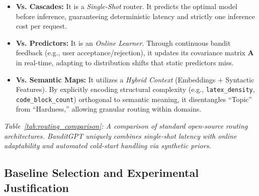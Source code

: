 \begin{itemize}
    \item \textbf{Vs. Cascades:} It is a \textit{Single-Shot} router. It predicts the optimal model before inference, guaranteeing deterministic latency and strictly one inference cost per request.
    \item \textbf{Vs. Predictors:} It is an \textit{Online Learner}. Through continuous bandit feedback (e.g., user acceptance/rejection), it updates its covariance matrix $\mathbf{A}$ in real-time, adapting to distribution shifts that static predictors miss.
    \item \textbf{Vs. Semantic Maps:} It utilizes a \textit{Hybrid Context} (Embeddings + Syntactic Features). By explicitly encoding structural complexity (e.g., \texttt{latex\_density}, \texttt{code\_block\_count}) orthogonal to semantic meaning, it disentangles ``Topic'' from ``Hardness,'' allowing granular routing within domains.
\end{itemize}

\begin{table}[h]
\centering
\caption{Feature Comparison of Routing Frameworks}
\label{tab:routing_comparison}
\end{table}

\noindent \textit{Table~\ref{tab:routing_comparison}: A comparison of standard open-source routing architectures. BanditGPT uniquely combines single-shot latency with online adaptability and automated cold-start handling via synthetic priors.}

\subsection{Baseline Selection and Experimental Justification}

